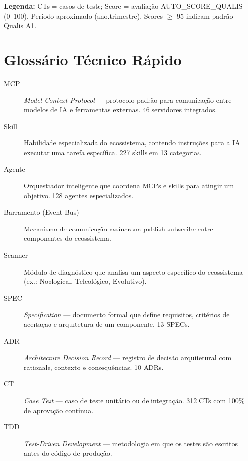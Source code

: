 \noindent \textbf{Legenda:} CTs = casos de teste; Score = avaliação
AUTO\_SCORE\_QUALIS (0--100). Período aproximado (ano.trimestre).
Scores $\geq$ 95 indicam padrão Qualis A1.

\section*{Glossário Técnico Rápido}

\begin{description}

\item[MCP] \emph{Model Context Protocol} --- protocolo padrão para comunicação
entre modelos de IA e ferramentas externas. 46 servidores integrados.

\item[Skill] Habilidade especializada do ecossistema, contendo instruções
para a IA executar uma tarefa específica. 227 skills em 13 categorias.

\item[Agente] Orquestrador inteligente que coordena MCPs e skills para
atingir um objetivo. 128 agentes especializados.

\item[Barramento (Event Bus)] Mecanismo de comunicação assíncrona
publish-subscribe entre componentes do ecossistema.

\item[Scanner] Módulo de diagnóstico que analisa um aspecto específico do
ecossistema (ex.: Noological, Teleológico, Evolutivo).

\item[SPEC] \emph{Specification} --- documento formal que define requisitos,
critérios de aceitação e arquitetura de um componente. 13 SPECs.

\item[ADR] \emph{Architecture Decision Record} --- registro de decisão
arquitetural com rationale, contexto e consequências. 10 ADRs.

\item[CT] \emph{Case Test} --- caso de teste unitário ou de integração.
312 CTs com 100\% de aprovação contínua.

\item[TDD] \emph{Test-Driven Development} --- metodologia em que os testes
são escritos antes do código de produção.


\end{description}
